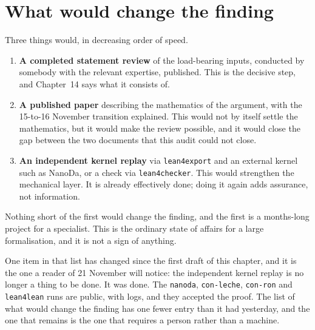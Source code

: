 \section{What would change the finding}Three things would, in decreasing order of speed.

\begin{enumerate}
\item \textbf{A completed statement review} of the load-bearing inputs,
conducted by somebody with the relevant expertise, published. This is the
decisive step, and Chapter~14 says what it consists of.

\item \textbf{A published paper} describing the mathematics of the argument,
with the 15-to-16 November transition explained. This would not by itself
settle the mathematics, but it would make the review possible, and it would
close the gap between the two documents that this audit could not close.

\item \textbf{An independent kernel replay} via \texttt{lean4export} and an
external kernel such as NanoDa, or a check via \texttt{lean4checker}. This
would strengthen the mechanical layer. It is already effectively done; doing
it again adds assurance, not information.
\end{enumerate}

Nothing short of the first would change the finding, and the first is a
months-long project for a specialist. This is the ordinary state of affairs
for a large formalisation, and it is not a sign of anything.

One item in that list has changed since the first draft of this chapter, and
it is the one a reader of 21 November will notice: the independent kernel
replay is no longer a thing to be done. It was done. The \texttt{nanoda},
\texttt{con-leche}, \texttt{con-ron} and \texttt{lean4lean} runs are public,
with logs, and they accepted the proof. The list of what would change the
finding has one fewer entry than it had yesterday, and the one that remains
is the one that requires a person rather than a machine.

